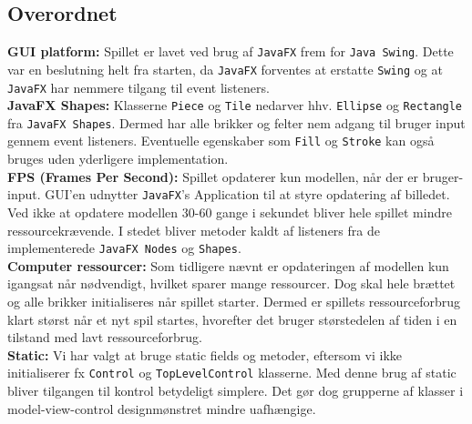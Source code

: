 \subsection{Overordnet}\label{sec:ImpOverordnet}

\textbf{GUI platform:} 
Spillet er lavet ved brug af \texttt{JavaFX} frem for \texttt{Java Swing}. Dette var en beslutning helt fra starten, da \texttt{JavaFX} forventes at erstatte \texttt{Swing} og at \texttt{JavaFX} har nemmere tilgang til event listeners. \\

\textbf{JavaFX Shapes:} 
Klasserne \texttt{Piece} og \texttt{Tile} nedarver hhv. \texttt{Ellipse} og \texttt{Rectangle} fra \texttt{JavaFX Shapes}. Dermed har alle brikker og felter nem adgang til bruger input gennem event listeners. Eventuelle egenskaber som \texttt{Fill} og \texttt{Stroke} kan også bruges uden yderligere implementation. 
\\

\textbf{FPS (Frames Per Second): } 
Spillet opdaterer kun modellen, når der er bruger-input. GUI'en udnytter \texttt{JavaFX}'s Application til at styre opdatering af billedet. Ved ikke at opdatere modellen 30-60 gange i sekundet bliver hele spillet mindre ressourcekrævende. I stedet bliver metoder kaldt af listeners fra de implementerede \texttt{JavaFX Nodes} og \texttt{Shapes}. \\

\textbf{Computer ressourcer:} 
Som tidligere nævnt er opdateringen af modellen kun igangsat når nødvendigt, hvilket sparer mange ressourcer. Dog skal hele brættet og alle brikker initialiseres når spillet starter. Dermed er spillets ressourceforbrug klart størst når et nyt spil startes, hvorefter det bruger størstedelen af tiden i en tilstand med lavt ressourceforbrug. 
\\

\textbf{Static:} 
Vi har valgt at bruge static fields og metoder, eftersom vi ikke initialiserer fx \texttt{Control} og \texttt{TopLevelControl} klasserne. Med denne brug af static bliver tilgangen til kontrol betydeligt simplere. Det gør dog grupperne af klasser i model-view-control designmønstret mindre uafhængige.
\\

